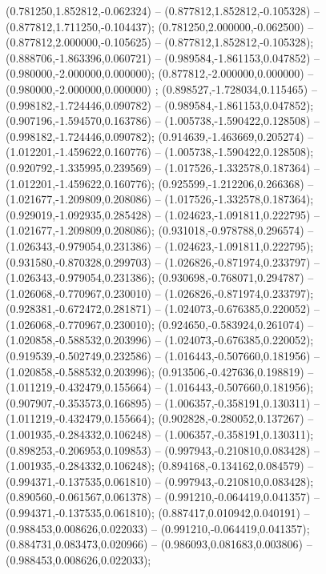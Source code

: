  (0.781250,1.852812,-0.062324) -- (0.877812,1.852812,-0.105328) -- (0.877812,1.711250,-0.104437);
 (0.781250,2.000000,-0.062500) -- (0.877812,2.000000,-0.105625) -- (0.877812,1.852812,-0.105328);
 (0.888706,-1.863396,0.060721) -- (0.989584,-1.861153,0.047852) -- (0.980000,-2.000000,0.000000);
 (0.877812,-2.000000,0.000000) -- (0.980000,-2.000000,0.000000) ;
 (0.898527,-1.728034,0.115465) -- (0.998182,-1.724446,0.090782) -- (0.989584,-1.861153,0.047852);
 (0.907196,-1.594570,0.163786) -- (1.005738,-1.590422,0.128508) -- (0.998182,-1.724446,0.090782);
 (0.914639,-1.463669,0.205274) -- (1.012201,-1.459622,0.160776) -- (1.005738,-1.590422,0.128508);
 (0.920792,-1.335995,0.239569) -- (1.017526,-1.332578,0.187364) -- (1.012201,-1.459622,0.160776);
 (0.925599,-1.212206,0.266368) -- (1.021677,-1.209809,0.208086) -- (1.017526,-1.332578,0.187364);
 (0.929019,-1.092935,0.285428) -- (1.024623,-1.091811,0.222795) -- (1.021677,-1.209809,0.208086);
 (0.931018,-0.978788,0.296574) -- (1.026343,-0.979054,0.231386) -- (1.024623,-1.091811,0.222795);
 (0.931580,-0.870328,0.299703) -- (1.026826,-0.871974,0.233797) -- (1.026343,-0.979054,0.231386);
 (0.930698,-0.768071,0.294787) -- (1.026068,-0.770967,0.230010) -- (1.026826,-0.871974,0.233797);
 (0.928381,-0.672472,0.281871) -- (1.024073,-0.676385,0.220052) -- (1.026068,-0.770967,0.230010);
 (0.924650,-0.583924,0.261074) -- (1.020858,-0.588532,0.203996) -- (1.024073,-0.676385,0.220052);
 (0.919539,-0.502749,0.232586) -- (1.016443,-0.507660,0.181956) -- (1.020858,-0.588532,0.203996);
 (0.913506,-0.427636,0.198819) -- (1.011219,-0.432479,0.155664) -- (1.016443,-0.507660,0.181956);
 (0.907907,-0.353573,0.166895) -- (1.006357,-0.358191,0.130311) -- (1.011219,-0.432479,0.155664);
 (0.902828,-0.280052,0.137267) -- (1.001935,-0.284332,0.106248) -- (1.006357,-0.358191,0.130311);
 (0.898253,-0.206953,0.109853) -- (0.997943,-0.210810,0.083428) -- (1.001935,-0.284332,0.106248);
 (0.894168,-0.134162,0.084579) -- (0.994371,-0.137535,0.061810) -- (0.997943,-0.210810,0.083428);
 (0.890560,-0.061567,0.061378) -- (0.991210,-0.064419,0.041357) -- (0.994371,-0.137535,0.061810);
 (0.887417,0.010942,0.040191) -- (0.988453,0.008626,0.022033) -- (0.991210,-0.064419,0.041357);
 (0.884731,0.083473,0.020966) -- (0.986093,0.081683,0.003806) -- (0.988453,0.008626,0.022033);
